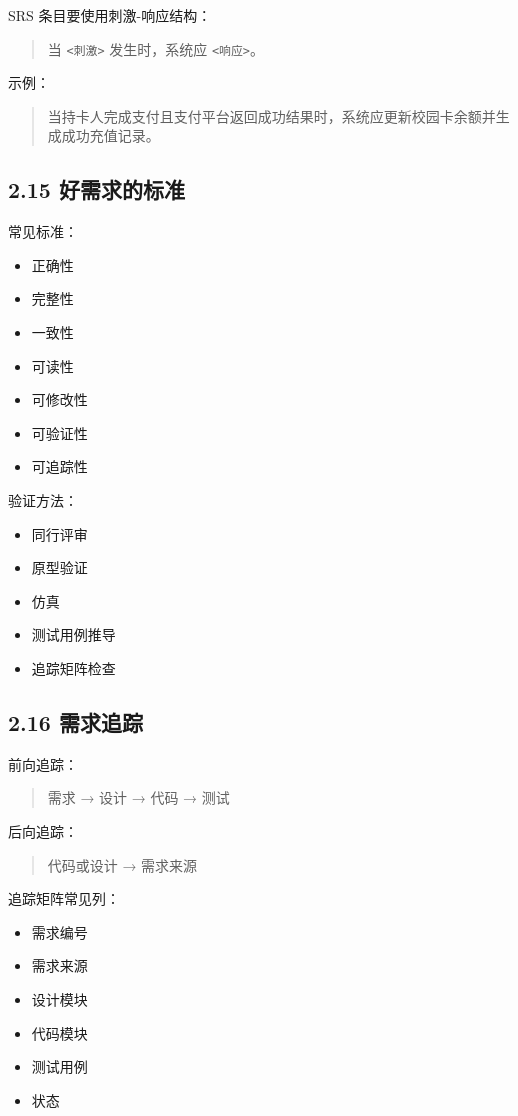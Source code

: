 \documentclass[UTF8,zihao=-4]{ctexart}
\begin{document}
SRS 条目要使用刺激-响应结构：

\begin{quote}
当 \texttt{<刺激>} 发生时，系统应 \texttt{<响应>}。
\end{quote}

示例：

\begin{quote}
当持卡人完成支付且支付平台返回成功结果时，系统应更新校园卡余额并生成成功充值记录。
\end{quote}

\subsection{2.15 好需求的标准}

常见标准：

\begin{itemize}
\item 正确性
\item 完整性
\item 一致性
\item 可读性
\item 可修改性
\item 可验证性
\item 可追踪性
\end{itemize}

验证方法：

\begin{itemize}
\item 同行评审
\item 原型验证
\item 仿真
\item 测试用例推导
\item 追踪矩阵检查
\end{itemize}

\subsection{2.16 需求追踪}

前向追踪：

\begin{quote}
需求 → 设计 → 代码 → 测试
\end{quote}

后向追踪：

\begin{quote}
代码或设计 → 需求来源
\end{quote}

追踪矩阵常见列：

\begin{itemize}
\item 需求编号
\item 需求来源
\item 设计模块
\item 代码模块
\item 测试用例
\item 状态
\end{itemize}
\end{document}
